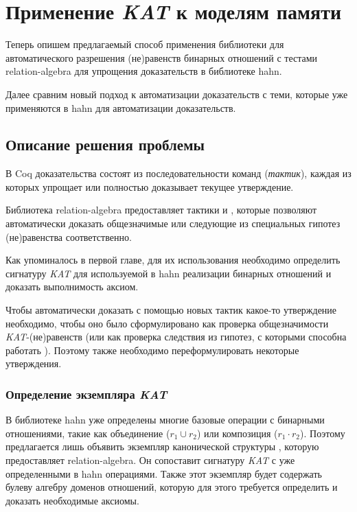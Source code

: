 \documentclass[times
              ,specification
              ,annotation
              ]{itmo-student-thesis}
\begin{document}
\chapter{Применение \textit{KAT} к моделям памяти}\label{chapter:2}

  Теперь опишем предлагаемый способ применения библиотеки для автоматического разрешения (не)равенств
  бинарных отношений с тестами relation-algebra для упрощения доказательств в библиотеке hahn.

  Далее сравним новый подход к автоматизации доказательств с теми, которые уже применяются в hahn для автоматизации доказательств.

  \section{Описание решения проблемы}

    В Coq доказательства состоят из последовательности команд (\textit{тактик}), каждая из
    которых упрощает или полностью доказывает текущее утверждение.

    Библиотека relation-algebra предоставляет тактики  и ,
    которые позволяют автоматически доказать общезначимые или следующие из специальных гипотез
    (не)равенства соответственно.

    Как упоминалось в первой главе, для их использования необходимо определить сигнатуру \textit{KAT} для
    используемой в hahn реализации бинарных отношений и доказать выполнимость аксиом.

    Чтобы автоматически доказать с помощью новых тактик какое-то утверждение необходимо, чтобы оно было
    сформулировано как проверка общезначимости \textit{KAT}-(не)равенств (или как проверка следствия из
    гипотез, с которыми способна работать ).
    Поэтому также необходимо переформулировать некоторые утверждения.

    \subsection{Определение экземпляра \textit{KAT}}

      В библиотеке hahn уже определены многие базовые операции с бинарными отношениями, такие как
      объединение ($r_1 \cup r_2$) или композиция ($r_1 \cdot r_2$). Поэтому предлагается
      лишь объявить экземпляр канонической структуры , которую предоставляет
      relation-algebra. Он сопоставит сигнатуру \textit{KAT} с уже определенными в hahn операциями.
      Также этот экземпляр будет содержать булеву алгебру доменов отношений, которую для этого
      требуется определить и доказать необходимые аксиомы.
\end{document}
